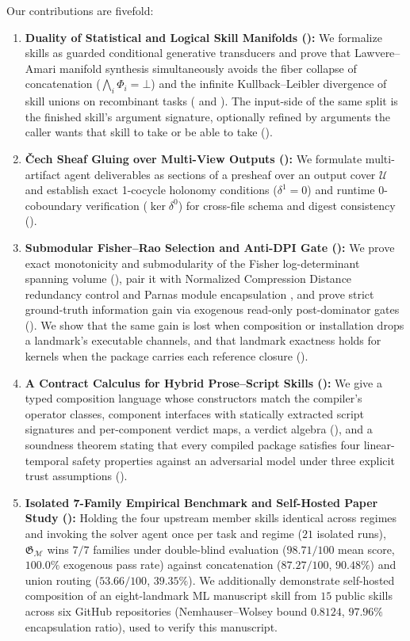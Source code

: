 \documentclass[11pt]{article}
\theoremstyle{definition}
\theoremstyle{plain}
\newcommand{\Ucal}{\mathcal{U}}
\newcommand{\Mcal}{\mathcal{M}}
\newcommand{\Gfrak}{\mathfrak{G}}
\begin{document}
Our contributions are fivefold:
\begin{enumerate}[leftmargin=1.8em,itemsep=2pt,topsep=3pt]
  \item \textbf{Duality of Statistical and Logical Skill Manifolds ():} We formalize skills as guarded conditional generative transducers and prove that Lawvere--Amari manifold synthesis simultaneously avoids the fiber collapse of concatenation ($\bigwedge_i \Phi_i = \bot$) and the infinite Kullback--Leibler divergence of skill unions on recombinant tasks ( and ). The input-side of the same split is the finished skill's argument signature, optionally refined by arguments the caller wants that skill to take or be able to take ().
  \item \textbf{\v{C}ech Sheaf Gluing over Multi-View Outputs ():} We formulate multi-artifact agent deliverables as sections of a presheaf over an output cover $\Ucal$ and establish exact 1-cocycle holonomy conditions ($\delta^1 = 0$) and runtime 0-coboundary verification ($\ker \delta^0$) for cross-file schema and digest consistency ().
  \item \textbf{Submodular Fisher--Rao Selection and Anti-DPI Gate ():} We prove exact monotonicity and submodularity of the Fisher log-determinant spanning volume (), pair it with Normalized Compression Distance redundancy control and Parnas module encapsulation \citep{parnas1972criteria}, and prove strict ground-truth information gain via exogenous read-only post-dominator gates (). We show that the same gain is lost when composition or installation drops a landmark's executable channels, and that landmark exactness holds for kernels when the package carries each reference closure ().
  \item \textbf{A Contract Calculus for Hybrid Prose--Script Skills ():} We give a typed composition language whose constructors match the compiler's operator classes, component interfaces with statically extracted script signatures and per-component verdict maps, a verdict algebra (), and a soundness theorem stating that every compiled package satisfies four linear-temporal safety properties against an adversarial model under three explicit trust assumptions ().
  \item \textbf{Isolated 7-Family Empirical Benchmark and Self-Hosted Paper Study ():} Holding the four upstream member skills identical across regimes and invoking the solver agent once per task and regime ($21$ isolated runs), $\Gfrak_{\Mcal}$ wins $7/7$ families under double-blind evaluation ($98.71/100$ mean score, $100.0\%$ exogenous pass rate) against concatenation ($87.27/100$, $90.48\%$) and union routing ($53.66/100$, $39.35\%$). We additionally demonstrate self-hosted composition of an eight-landmark ML manuscript skill from $15$ public skills across six GitHub repositories (Nemhauser--Wolsey bound $0.8124$, $97.96\%$ encapsulation ratio), used to verify this manuscript.
\end{enumerate}
\end{document}

